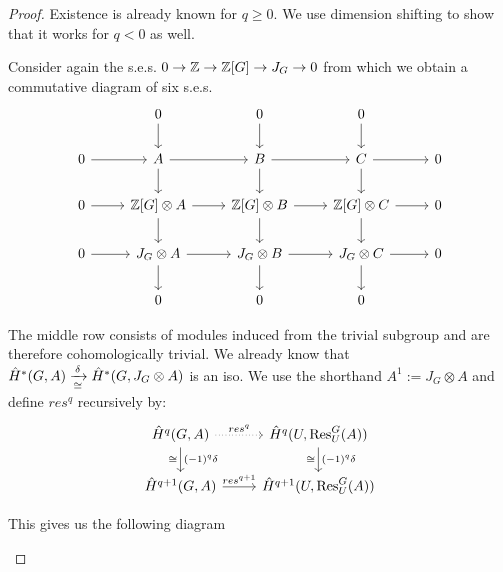 \documentclass[fontsize=11pt,fleqn,a4paper]{scrartcl}
\begin{document}
\begin{proof}
Existence is already known for $q\geq 0$. We use dimension shifting to show that it works for $q<0$ as well.

Consider again the s.e.s. $0\to\mathbb{Z}\to\mathbb{Z}[G]\to J_G\to 0$ from which we obtain a commutative diagram of six s.e.s.
\[\begin{tikzcd}
& 0 \arrow[d] & 0 \arrow[d] & 0 \arrow[d] & \\
0 \arrow[r] & A \arrow[d]\arrow[r] & B \arrow[d]\arrow[r] & C \arrow[d]\arrow[r] & 0 \\
0 \arrow[r] & \IZ[G]\otimes A \arrow[d]\arrow[r] & \IZ[G]\otimes B \arrow[d]\arrow[r] & \IZ[G]\otimes C \arrow[d]\arrow[r] & 0 \\
0 \arrow[r] & J_G\otimes A \arrow[d]\arrow[r] & J_G\otimes B \arrow[d]\arrow[r] & J_G\otimes C \arrow[d]\arrow[r] & 0 \\
& 0 & 0 & 0 & 
\end{tikzcd}\]

The middle row consists of modules induced from the trivial subgroup and are therefore cohomologically trivial. We already know that $\hat{H}^\ast(G,A) \xrightarrow[\cong]{\delta} \hat{H}^\ast(G,J_G\otimes A)$ is an iso. We use the shorthand $A^1 := J_G\otimes A$ and define $res^q$ recursively by:
\[\begin{tikzcd}
\hat{H}^q(G,A) \arrow[r,dotted,"res^q"] \arrow[d,"(-1)^q\delta","\isomorphic"'] & \hat{H}^q(U,\Res_U^G(A)) \arrow[d,"(-1)^q\delta","\isomorphic"'] \\
\hat{H}^{q+1}(G,A) \arrow[r,"res^{q+1}"] & \hat{H}^{q+1}(U,\Res_U^G(A))
\end{tikzcd}\]

This gives us the following diagram
\begin{figure}[tp]
\centering
{}
\end{figure}
\end{proof}
\end{document}
